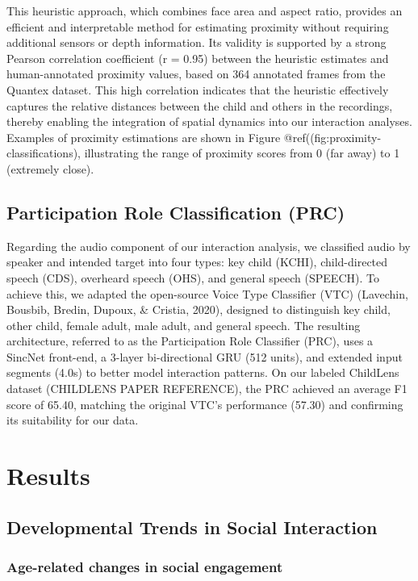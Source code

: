 \documentclass[
  man,floatsintext]{apa6}
\begin{document}
This heuristic approach, which combines face area and aspect ratio, provides an efficient and interpretable method for estimating proximity without requiring additional sensors or depth information. Its validity is supported by a strong Pearson correlation coefficient (r = 0.95) between the heuristic estimates and human-annotated proximity values, based on 364 annotated frames from the Quantex dataset. This high correlation indicates that the heuristic effectively captures the relative distances between the child and others in the recordings, thereby enabling the integration of spatial dynamics into our interaction analyses. Examples of proximity estimations are shown in Figure @ref((fig:proximity-classifications), illustrating the range of proximity scores from 0 (far away) to 1 (extremely close).

\subsection{Participation Role Classification (PRC)}\label{voice-type}

Regarding the audio component of our interaction analysis, we classified audio by speaker and intended target into four types: key child (KCHI), child-directed speech (CDS), overheard speech (OHS), and general speech (SPEECH). To achieve this, we adapted the open-source Voice Type Classifier (VTC) (Lavechin, Bousbib, Bredin, Dupoux, \& Cristia, 2020), designed to distinguish key child, other child, female adult, male adult, and general speech. The resulting architecture, referred to as the Participation Role Classifier (PRC), uses a SincNet front-end, a 3-layer bi-directional GRU (512 units), and extended input segments (4.0s) to better model interaction patterns. On our labeled ChildLens dataset (CHILDLENS PAPER REFERENCE), the PRC achieved an average F1 score of 65.40, matching the original VTC's performance (57.30) and confirming its suitability for our data.

\section{Results}\label{results}

\subsection{Developmental Trends in Social Interaction}\label{developmental-trends-in-social-interaction}

\subsubsection{Age-related changes in social engagement}\label{age-related-changes-in-social-engagement}
\end{document}
